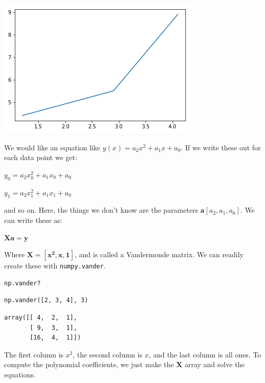 \documentclass[11pt]{article}
\begin{document}
\begin{center}
\includegraphics[width=.9\linewidth]{obipy-resources/e021eb5cde8c0f560ad245cab4a1f678-559298FK.png}
\end{center}

We would like an equation like \(y(x) = a_2 x^2 + a_1 x + a_0\). If we write these out for each data point we get:

\(y_0 = a_2 x_0^2 + a_1 x_0 + a_0\)

\(y_1 = a_2 x_1^2 + a_1 x_1 + a_0\)

and so on. Here, the things we don't know are the parameters \(\mathbf{a} [a_2, a_1, a_0]\). We can write these as:

\(\mathbf{X} \mathbf{a} = \mathbf{y}\)

Where \(\mathbf{X} = [\mathbf{x^2}, \mathbf{x}, \mathbf{1}]\), and is called a Vandermonde matrix. We can readily create these with \texttt{numpy.vander}.

\begin{verbatim}
np.vander?
\end{verbatim}

\begin{verbatim}
np.vander([2, 3, 4], 3)
\end{verbatim}

\begin{verbatim}
array([[ 4,  2,  1],
       [ 9,  3,  1],
       [16,  4,  1]])
\end{verbatim}

The first column is \(x^2\), the second column is \(x\), and the last column is all ones. To compute the polynomial coefficients, we just make the \(\mathbf{X}\) array and solve the equations.
\end{document}
